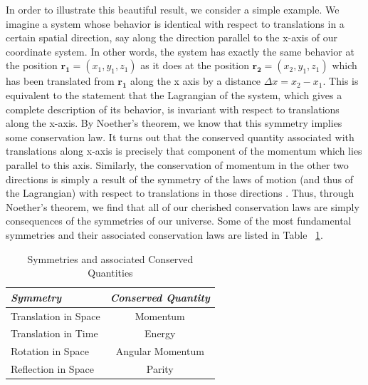 \documentclass[12pt]{book}
\begin{document}
In order to illustrate this beautiful result, we consider a simple example. We imagine a system whose behavior is identical with respect to translations in a certain spatial direction, say along the direction parallel to the x-axis of our coordinate system. In other words, the system has exactly the same behavior at the position $\mathbf{r_{1}}=(x_{1},y_{1},z_{1})$ as it does at the position $\mathbf{r_{2}}=(x_{2},y_{1},z_{1})$ which has been translated from $\mathbf{r_{1}}$ along the x axis by a distance $\Delta x=x_{2}-x_{1}$. This is equivalent to the statement that the Lagrangian of the system, which gives a complete description of its behavior, is invariant with respect to translations along the x-axis. By Noether's theorem, we know that this symmetry implies some conservation law. It turns out that the conserved quantity associated with translations along x-axis is precisely that component of the momentum which lies parallel to this axis. Similarly, the conservation of momentum in the other two directions is simply a result of the symmetry of the laws of motion (and thus of the Lagrangian) with respect to translations in those directions \cite{Schumm}. Thus, through Noether's theorem, we find that all of our cherished conservation laws are simply consequences of the symmetries of our universe. Some of the most fundamental symmetries and their associated conservation laws are listed in Table ~\ref{sym_cons}.
\begin{table}
\caption{Symmetries and associated Conserved Quantities} %
\label{sym_cons}
\centering                           %
\begin{tabular}{l c}              %
\\ \hline \hline                             %
 \emph{Symmetry} &\emph{Conserved Quantity}
\\ [0.5ex]
\hline                                      %
Translation in Space & Momentum \\
Translation in Time & Energy \\
Rotation in Space & Angular Momentum \\
Reflection in Space & Parity \\
 
\hline
\end{tabular}
\end{table}
\end{document}
